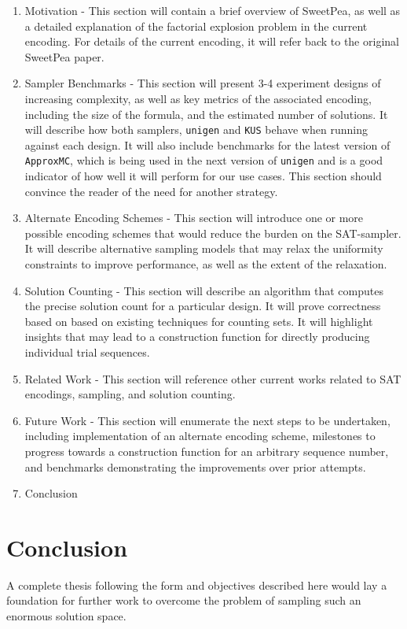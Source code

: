 \documentclass[a4paper]{article}
\begin{document}
\begin{enumerate}
\item Motivation - This section will contain a brief overview of SweetPea, as well as a detailed explanation of the factorial explosion problem in the current encoding. For details of the current encoding, it will refer back to the original SweetPea paper.
\item Sampler Benchmarks - This section will present 3-4 experiment designs of increasing complexity, as well as key metrics of the associated encoding, including the size of the formula, and the estimated number of solutions. It will describe how both samplers, \texttt{unigen} and \texttt{KUS} behave when running against each design. It will also include benchmarks for the latest version of \texttt{ApproxMC}, which is being used in the next version of \texttt{unigen} and is a good indicator of how well it will perform for our use cases. This section should convince the reader of the need for another strategy.
\item Alternate Encoding Schemes - This section will introduce one or more possible encoding schemes that would reduce the burden on the SAT-sampler. It will describe alternative sampling models that may relax the uniformity constraints to improve performance, as well as the extent of the relaxation.
\item Solution Counting - This section will describe an algorithm that computes the precise solution count for a particular design. It will prove correctness based on based on existing techniques for counting sets. It will highlight insights that may lead to a construction function for directly producing individual trial sequences.
\item Related Work - This section will reference other current works related to SAT encodings, sampling, and solution counting.
\item Future Work - This section will enumerate the next steps to be undertaken, including implementation of an alternate encoding scheme, milestones to progress towards a construction function for an arbitrary sequence number, and benchmarks demonstrating the improvements over prior attempts.
\item Conclusion
\end{enumerate}


\section*{Conclusion}

A complete thesis following the form and objectives described here would lay a foundation for further work to overcome the problem of sampling such an enormous solution space.
\end{document}
